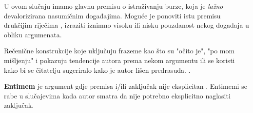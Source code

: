 \vspace{2 mm}

U ovom slučaju imamo glavnu premisu o istraživanju burze, koja je \emph{lažno} devalorizirana nasumičnim događajima. Moguće je ponoviti istu premisu drukčijim riječima , izraziti iznimno visoku  ili nisku pouzdanost  nekog događaja u obliku argumenata. 

\vspace{2 mm}

Rečenične konstrukcije koje uključuju frazeme kao što su "očito je", "po mom mišljenju" i pokazuju tendencije autora prema nekom argumentu ili se koristi kako bi se čitatelju sugeriralo kako je autor lišen predrasuda. \citep{harrellcreating}. 

\textbf{Entimem}  je argument gdje premisa i/ili zaključak nije eksplicitan \citep{bitzer1959aristotle}. Entimemi se rabe u slučajevima kada autor smatra da nije potrebno eksplicitno naglasiti zaključak.